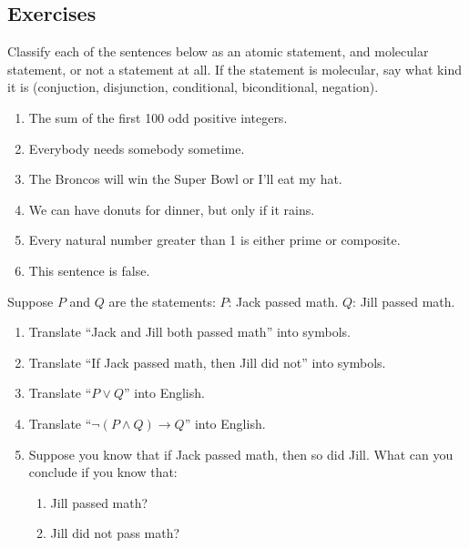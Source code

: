 \documentclass[10pt,]{book}
\theoremstyle{plain}
\theoremstyle{definition}
\theoremstyle{definition}
\theoremstyle{definition}
\theoremstyle{definition}
\numberwithin{equation}{chapter}
\def\imp{\rightarrow}
\begin{document}
\subsection*{Exercises}\label{exercises_intro-statements}
\begin{divisionexercise}{1}\hypertarget{exercise-177}{}
\hypertarget{p-1473}{}%
Classify each of the sentences below as an atomic statement, and molecular statement, or not a statement at all.  If the statement is molecular, say what kind it is (conjuction, disjunction, conditional, biconditional, negation). \leavevmode%
\begin{enumerate}[label=(\alph*)]
\item\hypertarget{li-323}{}The sum of the first 100 odd positive integers.%
\item\hypertarget{li-324}{}Everybody needs somebody sometime.%
\item\hypertarget{li-325}{}The Broncos will win the Super Bowl or I'll eat my hat.%
\item\hypertarget{li-326}{}We can have donuts for dinner, but only if it rains.%
\item\hypertarget{li-327}{}Every natural number greater than 1 is either prime or composite.%
\item\hypertarget{li-328}{}This sentence is false.%
\end{enumerate}
%
\end{divisionexercise}%
\begin{divisionexercise}{2}\hypertarget{exercise-178}{}
\hypertarget{p-1475}{}%
Suppose \(P\) and \(Q\) are the statements: \(P\): Jack passed math. \(Q\): Jill passed math.%
\leavevmode%
\begin{enumerate}[label=(\alph*)]
\item\hypertarget{li-335}{}\hypertarget{p-1476}{}%
Translate ``Jack and Jill both passed math'' into symbols.%
\item\hypertarget{li-336}{}\hypertarget{p-1477}{}%
Translate ``If Jack passed math, then Jill did not'' into symbols.%
\item\hypertarget{li-337}{}\hypertarget{p-1478}{}%
Translate ``\(P \vee Q\)'' into English.%
\item\hypertarget{li-338}{}\hypertarget{p-1479}{}%
Translate ``\(\neg(P \wedge Q) \imp Q\)'' into English.%
\item\hypertarget{li-339}{}\hypertarget{p-1480}{}%
Suppose you know that if Jack passed math, then so did Jill.  What can you conclude if you know that: %
\begin{enumerate}[label=\roman*.]
\item\hypertarget{li-340}{}Jill passed math?%
\item\hypertarget{li-341}{}Jill did not pass math?%
\end{enumerate}
%
\end{enumerate}
\end{divisionexercise}%
\end{document}
